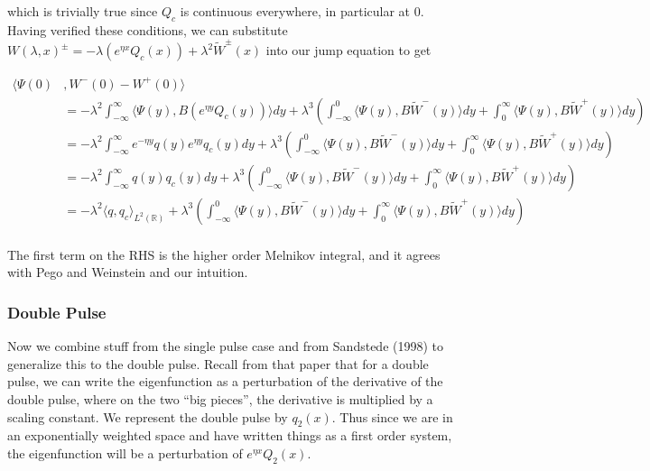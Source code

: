 \documentclass[12pt]{article}
\def\R{{\mathbb R}}
\begin{document}
which is trivially true since $Q_c$ is continuous everywhere, in particular at 0.\\

Having verified these conditions, we can substitute $W(\lambda, x)^\pm = -\lambda (e^{\eta x} Q_c(x)) + \lambda^2 \tilde{W}^\pm(x)$ into our jump equation to get

\begin{align*}
\langle\Psi(0) &, W^-(0) - W^+(0)\rangle \\
&= -\lambda^2 \int_{-\infty}^\infty \langle \Psi(y), B (e^{\eta y} Q_c(y)) \rangle dy + \lambda^3 \left( \int_{-\infty}^0 \langle \Psi(y), B \tilde{W}^-(y) \rangle dy + \int_0^\infty \langle \Psi(y), B \tilde{W}^+(y) \rangle dy \right) \\
&= -\lambda^2 \int_{-\infty}^\infty e^{-\eta y}q(y) e^{\eta y} q_c(y) dy + \lambda^3 \left( \int_{-\infty}^0 \langle \Psi(y), B \tilde{W}^-(y) \rangle dy + \int_0^\infty \langle \Psi(y), B \tilde{W}^+(y) \rangle dy \right) \\
&= -\lambda^2 \int_{-\infty}^\infty q(y) q_c(y) dy + \lambda^3 \left( \int_{-\infty}^0 \langle \Psi(y), B \tilde{W}^-(y) \rangle dy + \int_0^\infty \langle \Psi(y), B \tilde{W}^+(y) \rangle dy \right) \\
&= -\lambda^2 \langle q, q_c \rangle_{L^2(\R)} + \lambda^3 \left( \int_{-\infty}^0 \langle \Psi(y), B \tilde{W}^-(y) \rangle dy + \int_0^\infty \langle \Psi(y), B \tilde{W}^+(y) \rangle dy \right) \\
\end{align*}

The first term on the RHS is the higher order Melnikov integral, and it agrees with Pego and Weinstein and our intuition.

\subsubsection*{Double Pulse}

Now we combine stuff from the single pulse case and from Sandstede (1998) to generalize this to the double pulse. Recall from that paper that for a double pulse, we can write the eigenfunction as a perturbation of the derivative of the double pulse, where on the two ``big pieces'', the derivative is multiplied by a scaling constant. We represent the double pulse by $q_2(x)$. Thus since we are in an exponentially weighted space and have written things as a first order system, the eigenfunction will be a perturbation of $e^{\eta x}Q_2(x)$.
\end{document}
